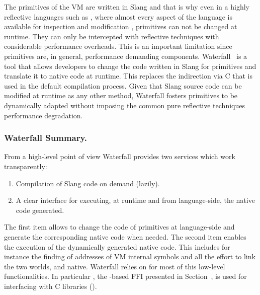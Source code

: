 The primitives of the VM are written in Slang and that is why even in a highly reflective languages such as \ST, where almost every aspect of the language is available for inspection and modification \cite{Denk10a}, primitives can not be changed at runtime. They can only be intercepted with reflective techniques with considerable performance overheads.
This is an important limitation since primitives are, in general, performance demanding components.
Waterfall~\cite{Char13a,Waterfall} is a tool that allows developers to change the code written in Slang for primitives and translate it to native code at runtime.
This replaces the indirection via C that is used in the default compilation process.
Given that Slang source code can be modified at runtime as any other \ST method, Waterfall fosters primitives to be dynamically adapted without imposing the common pure reflective techniques performance degradation.

\vspace{-3mm}
\subsubsection{Waterfall Summary.}
From a high-level point of view Waterfall provides two services which work transparently: 
%
\begin{enumerate}
	\item Compilation of Slang code on demand (lazily).
	\item A clear interface for executing, at runtime and from language-side, the native code generated.
\end{enumerate}
%
The first item allows to change the code of primitives at language-side and generate the corresponding native code when needed. %
The second item enables the execution of the dynamically generated native code.
This includes for instance the finding of addresses of VM internal symbols and all the effort to link the two worlds, \ST and native.
Waterfall relies on \B for most of this low-level functionalities.
In particular \NB, the \B-based FFI presented in Section~, is used for interfacing with C libraries (). 

